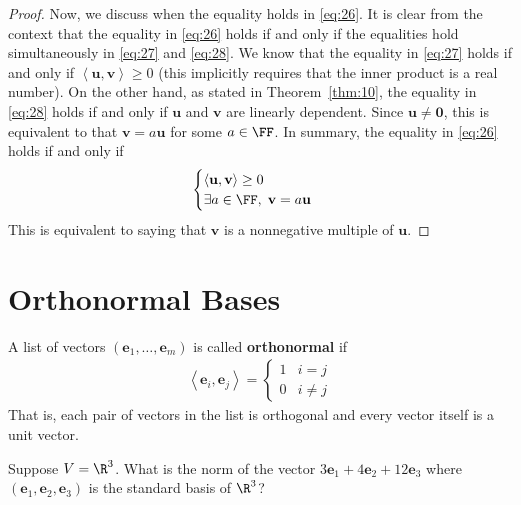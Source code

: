 \documentclass[thmcnt=section, color=blue, 12pt]{my-elegantbook}
\begin{document}
\begin{proof}
    \par Now, we discuss when the equality holds in \eqref{eq:26}. It is clear from the context that the equality in \eqref{eq:26} holds if and only if the equalities hold simultaneously in \eqref{eq:27} and \eqref{eq:28}. We know that the equality in \eqref{eq:27} holds if and only if $\left\langle \mathbf{u}, \mathbf{v} \right\rangle \geq 0$ (this implicitly requires that the inner product is a real number). On the other hand, as stated in Theorem~\ref{thm:10}, the equality in \eqref{eq:28} holds if and only if $\mathbf{u}$ and $\mathbf{v}$ are linearly dependent. Since $\mathbf{u} \neq \mathbf{0}$, this is equivalent to that $\mathbf{v} = a \mathbf{u}$ for some $a \in \FF$. In summary, the equality in \eqref{eq:26} holds if and only if 
    \begin{align*}
        \begin{cases}
            \left\langle \mathbf{u}, \mathbf{v} \right\rangle \geq 0 \\ 
            \exists a \in \FF, \; \mathbf{v} = a \mathbf{u}
        \end{cases}
    \end{align*}
    This is equivalent to saying that $\mathbf{v}$ is a nonnegative multiple of $\mathbf{u}$.
\end{proof}


\section{Orthonormal Bases}


\par A list of vectors $(\mathbf{e}_1, \ldots, \mathbf{e}_m)$ is called \textbf{orthonormal}  if 
\begin{align*}
    \left\langle
        \mathbf{e}_i, \mathbf{e}_j
    \right\rangle = \begin{cases}
        1 &i=j\\ 
        0 &i \neq j
    \end{cases}
\end{align*}
That is, each pair of vectors in the list is orthogonal and every vector itself is a unit vector.


\begin{exercise}
    Suppose $V = \R^3$. What is the norm of the vector $ 3 \mathbf{e}_1 + 4 \mathbf{e}_2 + 12 \mathbf{e}_3 $ where $(\mathbf{e}_1, \mathbf{e}_2, \mathbf{e}_3)$ is the standard basis of $\R^3$?

\end{exercise}
\end{document}
